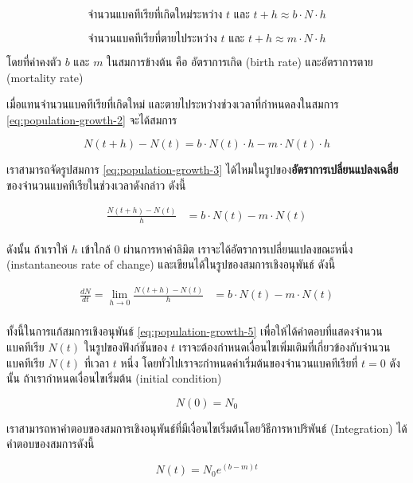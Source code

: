 \documentclass[landscape, 20pt]{extarticle}
\theoremstyle{definition}
\theoremstyle{remark}
\begin{document}
\[
\text{จำนวนแบคทีเรียที่เกิดใหม่ระหว่าง } t \text{ และ } t + h \approx b \cdot N \cdot h
\]

\[
\text{จำนวนแบคทีเรียที่ตายไประหว่าง } t \text{ และ } t + h \approx m \cdot N \cdot h
\]

โดยที่ค่าคงตัว \(b\) และ \(m\) ในสมการข้างต้น คือ อัตราการเกิด (birth rate) และอัตราการตาย (mortality rate)

เมื่อแทนจำนวนแบคทีเรียที่เกิดใหม่ และตายไประหว่างช่วงเวลาที่กำหนดลงในสมการ \eqref{eq:population-growth-2} จะได้สมการ

\begin{equation}
N(t + h) - N(t) = b\cdot N(t) \cdot h - m\cdot N(t) \cdot h
\label{eq:population-growth-3}
\end{equation}

เราสามารถจัดรูปสมการ \eqref{eq:population-growth-3} ได้ไหมในรูปของ\textbf{อัตราการเปลี่ยนแปลงเฉลี่ย}ของจำนวนแบคทีเรียในช่วงเวลาดังกล่าว ดังนี้

\begin{align}
\frac{N(t + h) - N(t)}{h} &= b\cdot N(t)  - m\cdot N(t)\\
\label{eq:population-growth-4}
\end{align}

ดังนั้น ถ้าเราให้ \(h\) เข้าใกล้ 0 ผ่านการหาค่าลิมิต เราจะได้อัตราการเปลี่ยนแปลงขณะหนึ่ง (instantaneous rate of change) และเขียนได้ในรูปของสมการเชิงอนุพันธ์ ดังนี้

\begin{align}
\frac{dN}{dt} = \lim_{h \rightarrow 0}\frac{N(t + h) - N(t)}{h} &= b\cdot N(t)  - m\cdot N(t)\\
\label{eq:population-growth-5}
\end{align}

ทั้งนี้ในการแก้สมการเชิงอนุพันธ์ \eqref{eq:population-growth-5} เพื่อให้ได้คำตอบที่แสดงจำนวนแบคทีเรีย \(N(t)\) ในรูปของฟังก์ชันของ \(t\) เราจะต้องกำหนดเงื่อนไขเพิ่มเติมที่เกี่ยวข้องกับจำนวนแบคทีเรีย \(N(t)\) ที่เวลา \(t\) หนึ่ง โดยทั่วไปเราจะกำหนดค่าเริ่มต้นของจำนวนแบคทีเรียที่ \(t = 0\) ดังนั้น ถ้าเรากำหนดเงื่อนไขเริ่มต้น (initial condition)

\begin{equation}
N(0) = N_0
\label{eq:population-growth-6}
\end{equation}

เราสามารถหาคำตอบของสมการเชิงอนุพันธ์ที่มีเงื่อนไขเริ่มต้นโดยวิธีการหาปริพันธ์ (Integration) ได้คำตอบของสมการดังนี้

\begin{equation}
N(t) = N_0 e^{(b-m)t}
\label{eq:population-growth-7}
\end{equation}
\end{document}
